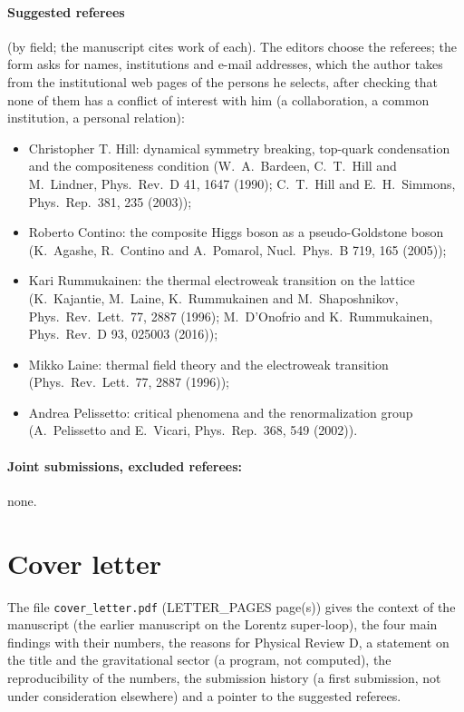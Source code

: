 \documentclass[11pt]{article}
\begin{document}
\paragraph{Suggested referees} (by field; the manuscript cites work of each). The editors choose the referees; the form
asks for names, institutions and e-mail addresses, which the author takes from the institutional web pages of the persons
he selects, after checking that none of them has a conflict of interest with him (a collaboration, a common institution,
a personal relation):
\begin{itemize}
\item Christopher T. Hill: dynamical symmetry breaking, top-quark condensation and the compositeness condition (W.~A.~Bardeen,
C.~T.~Hill and M.~Lindner, Phys.\ Rev.\ D 41, 1647 (1990); C.~T.~Hill and E.~H.~Simmons, Phys.\ Rep.\ 381, 235 (2003));
\item Roberto Contino: the composite Higgs boson as a pseudo-Goldstone boson (K.~Agashe, R.~Contino and A.~Pomarol, Nucl.\
Phys.\ B 719, 165 (2005));
\item Kari Rummukainen: the thermal electroweak transition on the lattice (K.~Kajantie, M.~Laine, K.~Rummukainen and
M.~Shaposhnikov, Phys.\ Rev.\ Lett.\ 77, 2887 (1996); M.~D'Onofrio and K.~Rummukainen, Phys.\ Rev.\ D 93, 025003 (2016));
\item Mikko Laine: thermal field theory and the electroweak transition (Phys.\ Rev.\ Lett.\ 77, 2887 (1996));
\item Andrea Pelissetto: critical phenomena and the renormalization group (A.~Pelissetto and E.~Vicari, Phys.\ Rep.\ 368,
549 (2002)).
\end{itemize}

\paragraph{Joint submissions, excluded referees:} none.

\section{Cover letter}

The file \texttt{cover\_letter.pdf} ({{LETTER_PAGES}} page(s)) gives the context of the manuscript (the earlier manuscript
on the Lorentz super-loop), the four main findings with their numbers, the reasons for Physical Review D, a statement on
the title and the gravitational sector (a program, not computed), the reproducibility of the numbers, the submission
history (a first submission, not under consideration elsewhere) and a pointer to the suggested referees.
\end{document}
